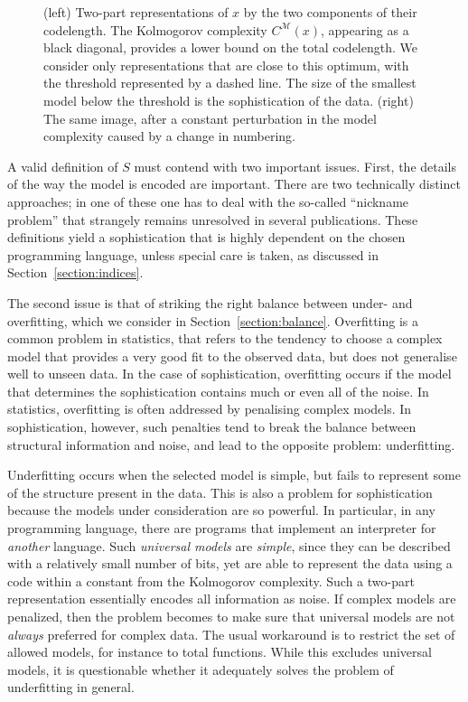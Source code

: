 \documentclass{style/llncs}
\newcommand{\M}{\mathscr M}
\begin{document}
\begin{figure}[tb]
\begin{minipage}{0.40\textwidth}
  \end{minipage}
  \caption{\small (left) Two-part representations of $x$ by the two components of their codelength. The Kolmogorov complexity $C^\M(x)$, appearing as a black diagonal, provides a lower bound on the total codelength. We consider only representations that are close to this optimum, with the threshold represented by a dashed line. The size of the smallest model below the threshold is the sophistication of the data. (right) The same image, after a constant perturbation in the model complexity caused by a change in numbering.}
  \label{fig:diagram}
\end{figure}

A valid definition of $S$ must contend with two important issues. First, the details of the way the model is encoded are important. There are two technically distinct approaches; in one of these one has to deal with the so-called ``nickname problem'' that strangely remains unresolved in several publications. These definitions yield a sophistication that is highly dependent on the chosen programming language, unless special care is taken, as discussed in Section~\ref{section:indices}.

The second issue is that of striking the right balance between under- and overfitting, which we consider in Section~\ref{section:balance}. Overfitting is a common problem in statistics, that refers to the tendency to choose a complex model that provides a very good fit to the observed data, but does not generalise well to unseen data. In the case of sophistication, overfitting occurs if the model that determines the sophistication contains much or even all of the noise. In statistics, overfitting is often addressed by penalising complex models. In sophistication, however, such penalties tend to break the balance between structural information and noise, and lead to the opposite problem: underfitting.

Underfitting occurs when the selected model is simple, but fails to represent some of the structure present in the data. This is also a problem for sophistication because the models under consideration are so powerful. In particular, in any programming language, there are programs that implement an interpreter for \emph{another} language. Such \emph{universal models} are \emph{simple}, since they can be described with a relatively small number of bits, yet are able to represent the data using a code within a constant from the Kolmogorov complexity. Such a two-part representation essentially encodes all information as noise. If complex models are penalized, then the problem becomes to make sure that universal models are not \emph{always} preferred for complex data. The usual workaround is to restrict the set of allowed models, for instance to total functions. While this excludes universal models, it is questionable whether it adequately solves the problem of underfitting in general.
\end{document}
